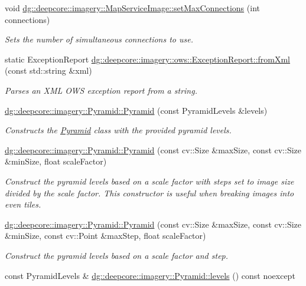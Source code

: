 \begin{DoxyCompactItemize}
void \hyperlink{group___imagery_module_gacdb5a20006863ccb0f9601362e635df9}{dg\+::deepcore\+::imagery\+::\+Map\+Service\+Image\+::set\+Max\+Connections} (int connections)
\begin{DoxyCompactList}\small\item\em Sets the number of simultaneous connections to use. \end{DoxyCompactList}\item 
static Exception\+Report \hyperlink{group___imagery_module_ga7b82aed41808b9bebc202721d9a5adce}{dg\+::deepcore\+::imagery\+::ows\+::\+Exception\+Report\+::from\+Xml} (const std\+::string \&xml)
\begin{DoxyCompactList}\small\item\em Parses an X\+ML O\+WS exception report from a string. \end{DoxyCompactList}\item 
\hyperlink{group___imagery_module_ga5133c51d0c8c7ca698287d5d4dd61986}{dg\+::deepcore\+::imagery\+::\+Pyramid\+::\+Pyramid} (const Pyramid\+Levels \&levels)
\begin{DoxyCompactList}\small\item\em Constructs the \hyperlink{classdg_1_1deepcore_1_1imagery_1_1_pyramid}{Pyramid} class with the provided pyramid levels. \end{DoxyCompactList}\item 
\hyperlink{group___imagery_module_ga0d97d66a5c60146ee198f282e3633778}{dg\+::deepcore\+::imagery\+::\+Pyramid\+::\+Pyramid} (const cv\+::\+Size \&max\+Size, const cv\+::\+Size \&min\+Size, float scale\+Factor)
\begin{DoxyCompactList}\small\item\em Construct the pyramid levels based on a scale factor with steps set to image size divided by the scale factor. This constructor is useful when breaking images into even tiles. \end{DoxyCompactList}\item 
\hyperlink{group___imagery_module_ga92c5dda62793cc05a2fe10b8c85c7e65}{dg\+::deepcore\+::imagery\+::\+Pyramid\+::\+Pyramid} (const cv\+::\+Size \&max\+Size, const cv\+::\+Size \&min\+Size, const cv\+::\+Point \&max\+Step, float scale\+Factor)
\begin{DoxyCompactList}\small\item\em Construct the pyramid levels based on a scale factor and step. \end{DoxyCompactList}\item 
const Pyramid\+Levels \& \hyperlink{group___imagery_module_ga91d47b866ba5242dd28833d4c7607b1b}{dg\+::deepcore\+::imagery\+::\+Pyramid\+::levels} () const noexcept

\end{DoxyCompactItemize}

